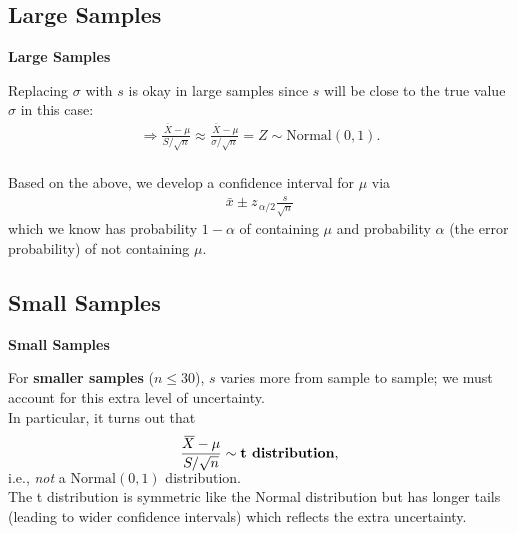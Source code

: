 \documentclass[compress]{beamer}        %
\makeatletter
\newcommand{\tcb}{\textcolor{beamer@blendedblue}}
\makeatother
\begin{document}
\subsection{Large Samples}
\begin{frame}{\bf \tcb{Large Samples}}

Replacing $\sigma$ with $s$ is okay in large samples since $s$ will be close to the true value $\sigma$ in this case:\\[-0.1cm]
\begin{align*}
\Rightarrow \frac{\,\overline{\!X} - \mu}{S/\sqrt{n}} \approx \frac{\,\overline{\!X} - \mu}{\sigma/\sqrt{n}} = Z \sim \text{Normal}(0,1).\\[-0.1cm]
\end{align*}


Based on the above, we develop a confidence interval for $\mu$ via
\begin{align*}
\bar x \pm z_{\,\alpha/2} \frac{s}{\sqrt{n}}
\end{align*}
which we know has probability $1-\alpha$ of containing $\mu$ and probability $\alpha$ (the error probability) of not containing $\mu$.%


\end{frame}


\subsection{Small Samples}
\begin{frame}{\bf \tcb{Small Samples}}

For {\bf smaller samples} ($n\le30$), $s$ varies more from sample to sample; we must account for this extra level of uncertainty.\\[0.8cm]

In particular, it turns out that
\begin{align*}
\frac{\,\overline{\!X} - \mu}{S/\sqrt{n}} \sim \text{\bf t distribution}, \\[-0.3cm]
\end{align*}
i.e., \emph{not} a $\text{Normal}(0,1)$ distribution.\\[0.8cm]


The t distribution is symmetric like the Normal distribution but has longer tails (leading to wider confidence intervals) which reflects the extra uncertainty.

\end{frame}
\end{document}
